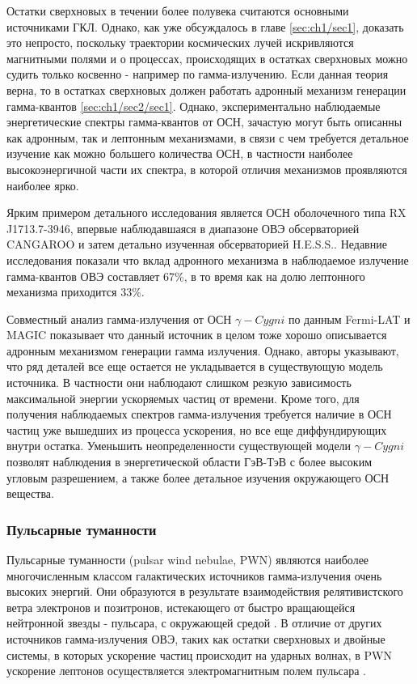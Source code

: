 Остатки сверхновых в течении более полувека считаются основными источниками ГКЛ. Однако, как уже обсуждалось в главе \ref{sec:ch1/sec1}, доказать это непросто, поскольку траектории космических лучей искривляются магнитными полями и о процессах, происходящих в остатках сверхновых можно судить только косвенно - например по гамма-излучению. Если данная теория верна, то в остатках сверхновых должен работать адронный механизм генерации гамма-квантов \ref{sec:ch1/sec2/sec1}. Однако, экспериментально наблюдаемые энергетические спектры гамма-квантов от ОСН, зачастую могут быть описанны как адронным, так и лептонным механизмами, в связи с чем требуется детальное изучение как можно большего количества ОСН, в частности наиболее высокоэнергичной части их спектра, в которой отличия механизмов проявляются наиболее ярко.

Ярким примером детального исследования является ОСН оболочечного типа RX J1713.7-3946, впервые наблюдавшаяся в диапазоне ОВЭ обсерваторией CANGAROO \cite{muraishi2000evidence} и затем детально изученная обсерваторией H.E.S.S.\cite{Aharonian_2004}. Недавние исследования показали что вклад адронного механизма в наблюдаемое излучение гамма-квантов ОВЭ составляет 67\%, в то время как на долю лептонного механизма приходится 33\%\cite{2021ApJ_915_84F}.

Совместный анализ гамма-излучения от ОСН $\gamma-Cygni$ по данным Fermi-LAT и MAGIC показывает что данный источник в целом тоже хорошо описывается адронным механизмом генерации гамма излучения\cite{Acciari_Cygni}. Однако, авторы указывают, что ряд деталей все еще остается не укладывается в существующую модель источника. В частности они наблюдают слишком резкую зависимость максимальной энергии ускоряемых частиц от времени. Кроме того, для получения наблюдаемых спектров гамма-излучения требуется наличие в ОСН частиц уже вышедших из процесса ускорения, но все еще диффундирующих внутри остатка. Уменьшить неопределенности существующей модели $\gamma-Cygni$ позволят наблюдения в энергетической области ГэВ-ТэВ с более высоким угловым разрешением, а также более детальное изучения окружающего ОСН вещества.

\subsubsection{Пульсарные туманности}
Пульсарные туманности (pulsar wind nebulae, PWN) являются наиболее многочисленным классом галактических источников гамма-излучения очень высоких энергий. Они образуются в результате взаимодействия релятивистского ветра электронов и позитронов, истекающего от быстро вращающейся нейтронной звезды - пульсара, с окружающей средой \cite{Gaensler_2006}. В отличие от других источников гамма-излучения ОВЭ, таких как остатки сверхновых и двойные системы, в которых ускорение частиц происходит на ударных волнах, в PWN ускорение лептонов осуществляется электромагнитным полем пульсара \cite{Gaisser_Engel_Resconi_2016}.

